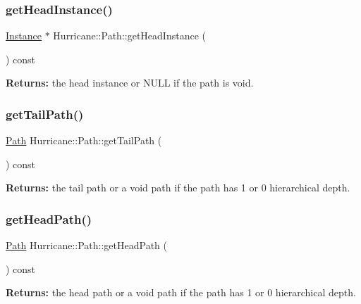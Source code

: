 \subsubsection{\texorpdfstring{get\+Head\+Instance()}{getHeadInstance()}}
{\footnotesize\ttfamily \hyperlink{classHurricane_1_1Instance}{Instance} $\ast$ Hurricane\+::\+Path\+::get\+Head\+Instance (\begin{DoxyParamCaption}{ }\end{DoxyParamCaption}) const}

{\bfseries Returns\+:} the head instance or N\+U\+LL if the path is void. \mbox{\label{classHurricane_1_1Path_af0b27566643cc252d9a0feb1709d3180}} 
\subsubsection{\texorpdfstring{get\+Tail\+Path()}{getTailPath()}}
{\footnotesize\ttfamily \hyperlink{classHurricane_1_1Path}{Path} Hurricane\+::\+Path\+::get\+Tail\+Path (\begin{DoxyParamCaption}{ }\end{DoxyParamCaption}) const}

{\bfseries Returns\+:} the tail path or a void path if the path has 1 or 0 hierarchical depth. \mbox{\label{classHurricane_1_1Path_ae89034b297b27545cf3865e0cfa31f3d}} 
\subsubsection{\texorpdfstring{get\+Head\+Path()}{getHeadPath()}}
{\footnotesize\ttfamily \hyperlink{classHurricane_1_1Path}{Path} Hurricane\+::\+Path\+::get\+Head\+Path (\begin{DoxyParamCaption}{ }\end{DoxyParamCaption}) const}

{\bfseries Returns\+:} the head path or a void path if the path has 1 or 0 hierarchical depth. \mbox{\label{classHurricane_1_1Path_a1f9350514c4751b54b2f01082a93e3bf}} 
